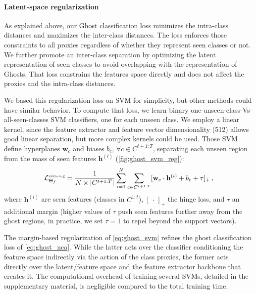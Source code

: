 


\label{sec:ghost_svm}
\paragraph{Latent-space regularization}
As explained above, our Ghost classification loss minimizes the intra-class distances and maximizes
the inter-class distances. The loss enforces those constraints to all proxies regardless of whether
they represent seen classes or not. We further promote an inter-class separation by optimizing the
latent representation of seen classes to avoid overlapping with the representation of Ghosts. That
loss constrains the features space directly and does not affect the proxies and the intra-class
distances.

We based this regularization loss on SVM \citep{cortes1995svm} for simplicity, but other methods
could have similar behavior. To compute that loss, we learn binary
one-unseen-class-Vs-all-seen-classes SVM classifiers, one for each unseen class. We employ a linear
kernel, since the feature extractor and feature vector dimensionality (512) allows good linear
separation, but more complex kernels could be used. Those \acs{SVM} define hyperplanes
$\mathbf{w}_c$ and biases $b_c,\, \forall c \in C^{t+1:T}$, separating each unseen region from the
mass of seen features $\mathbf{h}^{(i)}$ (\autoref{fig:ghost_svm_reg}):
%
\begin{equation}
    \mathcal{L}^\text{\tiny{svm-reg}}_{\Theta_f} = \frac{1} {N\times |C^{t+1:T}|}\sum_{i=1}^N \sum_{c\in C^{t+1:T}} [\mathbf{w}_c \cdot \mathbf{h}^{(i)} + b_c + \tau]_+\,,
    \label{eq:ghost_svm}
\end{equation}
%
where $\mathbf{h}^{(i)}$ are seen features (classes in $C^{1:t}$), $[\,\cdot\,]_+$ the hinge loss,
and $\tau$ an additional margin (higher values of $\tau$ push seen features further away from the
ghost regions, in practice, we set $\tau=1$ to repel beyond the support vectors).

The margin-based regularization of \autoref{eq:ghost_svm} refines the ghost classification loss of
\autoref{eq:ghost_nca}. While the latter acts over the classifier conditioning the feature space
indirectly via the action of the class proxies, the former acts directly over the latent/feature
space and the feature extractor backbone that creates it. The computational overhead of training
several SVMs, detailed in the supplementary material, is negligible compared to the total training
time.

